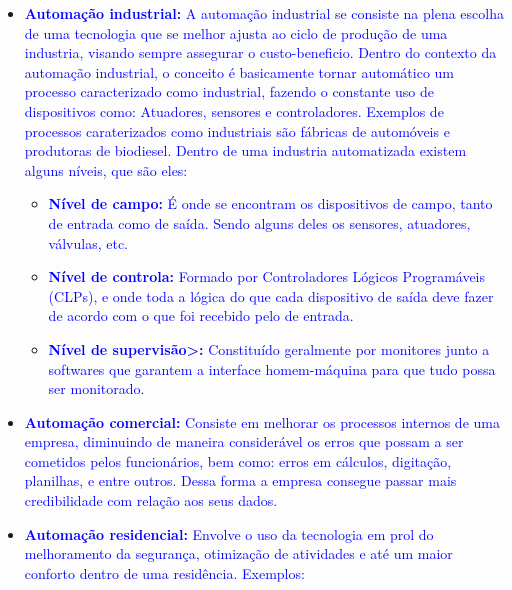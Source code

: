     \begin{itemize}
            \item \textbf{\textcolor{blue}{Automação industrial:}}
               \textcolor{blue}{ A automação industrial se consiste na plena escolha de uma tecnologia que se melhor ajusta ao ciclo de produção de uma industria, visando sempre assegurar o custo-beneficio. Dentro do contexto da automação industrial, o conceito é basicamente tornar automático um processo caracterizado como industrial, fazendo o constante uso de dispositivos como: Atuadores, sensores e controladores. Exemplos de processos caraterizados como industriais são fábricas de automóveis e produtoras de biodiesel\cite{livroAutomacao}. Dentro de uma industria automatizada existem alguns níveis, que são eles:}
                
                    \begin{itemize}
                        \item \textbf{\textcolor{blue}{Nível de campo:}} \textcolor{blue}{É onde se encontram os dispositivos de campo, tanto de entrada como de saída. Sendo alguns deles os sensores, atuadores, válvulas, etc.}
                        
                        \item \textbf{\textcolor{blue}{Nível de controla:}} \textcolor{blue}{Formado por Controladores Lógicos Programáveis (CLPs), e onde toda a lógica do que cada dispositivo de saída deve fazer de acordo com o que foi recebido pelo de entrada\cite{clps}.}
                        
                        \item \textbf{\textcolor{blue}{Nível de supervisão>:}} \textcolor{blue}{Constituído geralmente por monitores junto a softwares que garantem a interface homem-máquina para que tudo possa ser monitorado.}
                    \end{itemize}
              
            \item \textbf{\textcolor{blue}{Automação comercial:}}
                \textcolor{blue}{Consiste em melhorar os processos internos de uma empresa, diminuindo de maneira considerável os erros que possam a ser cometidos pelos funcionários, bem como: erros em cálculos, digitação, planilhas, e entre outros. Dessa forma a empresa consegue passar mais credibilidade com relação aos seus dados\cite{automacaoComercial}.}

            \item \textbf{\textcolor{blue}{Automação residencial:}}
               \textcolor{blue}{ Envolve o uso da tecnologia em prol do melhoramento da segurança, otimização de atividades e até um maior conforto dentro de uma residência. Exemplos:}


\end{itemize}
